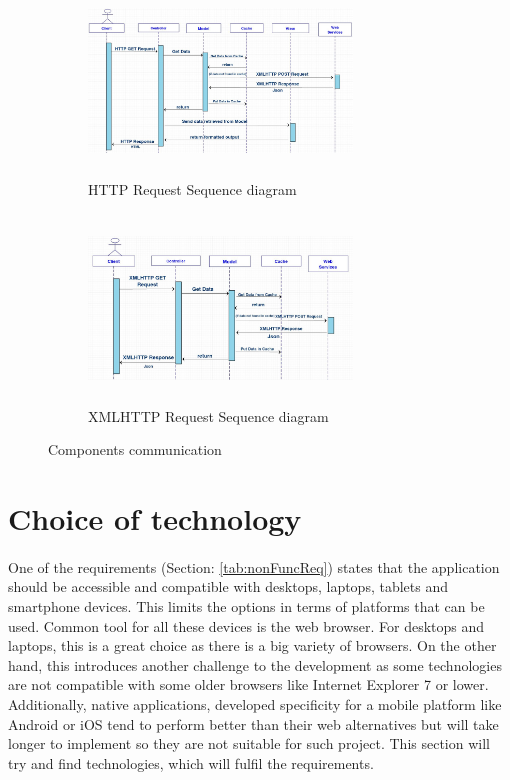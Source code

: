 \documentclass{l4proj}
\begin{document}
\begin{figure}[H]
	\begin{subfigure}{.5\textwidth}
		\centering
		\includegraphics[height=5cm,width=7cm]{images/HTTPRequestSequenceDiagram}
		\caption{HTTP Request Sequence diagram}
		\label{HTTPRequest}
	\end{subfigure}
	\begin{subfigure}{.5\textwidth}
		\centering
		\includegraphics[height=5cm,width=7cm]{images/XMLHTTPRequestSequenceDiagram}
		\caption{XMLHTTP Request Sequence diagram}
		\label{XMLHTTPRequest}
	\end{subfigure}
	\caption{Components communication}
\end{figure}

\clearpage

  

\section{Choice of technology}
\paragraph{}
One of the requirements (Section: \ref{tab:nonFuncReq}) states that the application should be accessible and compatible with desktops, laptops, tablets and smartphone devices. This limits the options in terms of platforms that can be used. Common tool for all these devices is the web browser. For desktops and laptops, this is a great choice as there is a big variety of browsers. On the other hand, this introduces another challenge to the development as some technologies are not compatible with some older browsers like Internet Explorer 7 or lower. Additionally, native applications, developed specificity for a mobile platform like Android or iOS tend to perform better than their web alternatives but will take longer to implement so they are not suitable for such project. This section will try and find technologies, which will fulfil the requirements.
\end{document}
